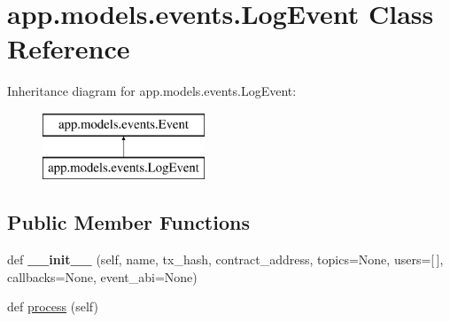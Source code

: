 \hypertarget{classapp_1_1models_1_1events_1_1_log_event}{}\section{app.\+models.\+events.\+Log\+Event Class Reference}
\label{classapp_1_1models_1_1events_1_1_log_event}
Inheritance diagram for app.\+models.\+events.\+Log\+Event\+:\begin{figure}[H]
\begin{center}
\leavevmode
\includegraphics[height=2.000000cm]{classapp_1_1models_1_1events_1_1_log_event}
\end{center}
\end{figure}
\subsection*{Public Member Functions}
\begin{DoxyCompactItemize}
\item 
\mbox{\label{classapp_1_1models_1_1events_1_1_log_event_a7649d5370cc93b9c72aaaa6c8ab80824}} 
def {\bfseries \+\_\+\+\_\+init\+\_\+\+\_\+} (self, name, tx\+\_\+hash, contract\+\_\+address, topics=None, users=\mbox{[}$\,$\mbox{]}, callbacks=None, event\+\_\+abi=None)
\item 
def \hyperlink{classapp_1_1models_1_1events_1_1_log_event_aa6ef2fc83a7537e2f286147deb948544}{process} (self)
\end{DoxyCompactItemize}
